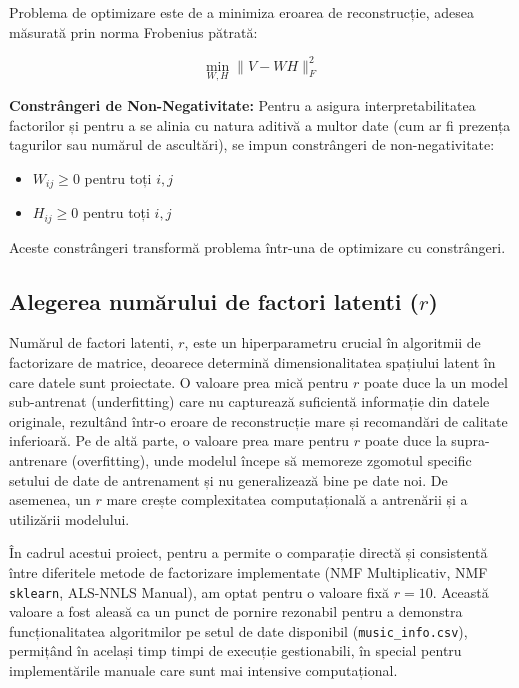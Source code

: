 \documentclass[12pt,a4paper]{article}
\begin{document}
	Problema de optimizare este de a minimiza eroarea de reconstrucție, adesea măsurată prin norma Frobenius pătrată:

	\begin{equation}
		\min_{W, H} \| V - W H \|_F^2
		\label{eq:nmf_objective_main}
	\end{equation}

	\textbf{Constrângeri de Non-Negativitate:}
	Pentru a asigura interpretabilitatea factorilor și pentru a se alinia cu natura aditivă a multor date (cum ar fi prezența tagurilor sau numărul de ascultări), se impun constrângeri de non-negativitate:
	\begin{itemize}
		\item $W_{ij} \geq 0$ pentru toți $i,j$
		\item $H_{ij} \geq 0$ pentru toți $i,j$
	\end{itemize}
	Aceste constrângeri transformă problema într-una de optimizare cu constrângeri.

	\subsection{Alegerea numărului de factori latenti ($r$)}
	\label{subsec:alegerea-r}

	Numărul de factori latenti, $r$, este un hiperparametru crucial în algoritmii de factorizare de matrice, deoarece determină dimensionalitatea spațiului latent în care datele sunt proiectate. O valoare prea mică pentru $r$ poate duce la un model sub-antrenat (underfitting) care nu capturează suficientă informație din datele originale, rezultând într-o eroare de reconstrucție mare și recomandări de calitate inferioară. Pe de altă parte, o valoare prea mare pentru $r$ poate duce la supra-antrenare (overfitting), unde modelul începe să memoreze zgomotul specific setului de date de antrenament și nu generalizează bine pe date noi. De asemenea, un $r$ mare crește complexitatea computațională a antrenării și a utilizării modelului.

	În cadrul acestui proiect, pentru a permite o comparație directă și consistentă între diferitele metode de factorizare implementate (NMF Multiplicativ, NMF \texttt{sklearn}, ALS-NNLS Manual), am optat pentru o valoare fixă $r = 10$. Această valoare a fost aleasă ca un punct de pornire rezonabil pentru a demonstra funcționalitatea algoritmilor pe setul de date disponibil (\texttt{music\_info.csv}), permițând în același timp timpi de execuție gestionabili, în special pentru implementările manuale care sunt mai intensive computațional.
\end{document}
